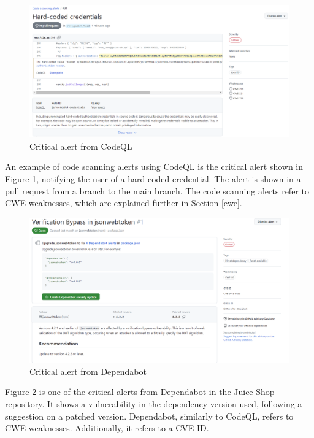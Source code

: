 \vspace{2mm}
\begin{figure}[H]
    \centering
    \includegraphics[width=0.8\columnwidth]{Images/codescan.png}
    \caption{Critical alert from CodeQL}
    \label{fig: Critical alert CodeQL}
\end{figure}

An example of code scanning alerts using CodeQL is the critical alert shown in Figure \ref{fig: Critical alert CodeQL}, notifying the user of a hard-coded credential. The alert is shown in a pull request from a branch to the main branch. The code scanning alerts refer to CWE weaknesses, which are explained further in Section \ref{cwe}.

\vspace{2mm}
\begin{figure}[H]
    \centering
    \includegraphics[width=0.8\columnwidth]{Images/dependabotalert.png}
    \caption{Critical alert from Dependabot}
    \label{fig: Critical alert from Dependabot}
\end{figure}

Figure \ref{fig: Critical alert from Dependabot} is one of the critical alerts from Dependabot in the Juice-Shop repository. It shows a vulnerability in the dependency version used, following a suggestion on a patched version. Dependabot, similarly to CodeQL, refers to CWE weaknesses. Additionally, it refers to a CVE ID. 

